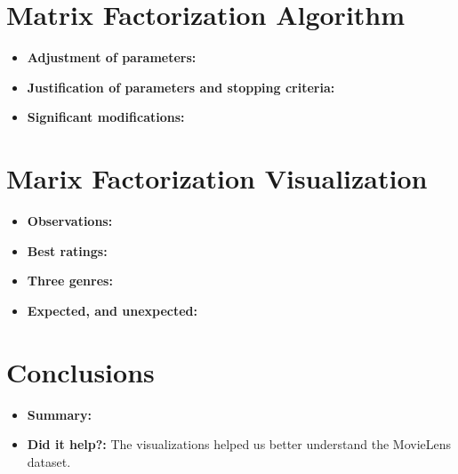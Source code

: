 \section{Matrix Factorization Algorithm}
\medskip
\begin{itemize}
  \item \textbf{Adjustment of parameters:}
  \item \textbf{Justification of parameters and stopping criteria:}
  \item \textbf{Significant modifications:}
\end{itemize}


\section{Marix Factorization Visualization}
\medskip
\begin{itemize}
  \item \textbf{Observations:} 
  \item \textbf{Best ratings:}
  \item \textbf{Three genres:}
  \item \textbf{Expected, and unexpected:}
\end{itemize}



\section{Conclusions}
\medskip
\begin{itemize}
  \item \textbf{Summary:}
  \item \textbf{Did it help?:} The visualizations helped us better understand the MovieLens dataset. 
\end{itemize}


